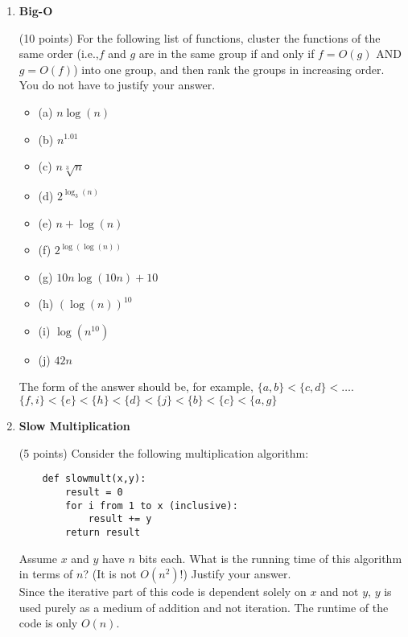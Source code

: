 \documentclass[11pt]{article}
\begin{document}
\begin{enumerate}

    \item \textbf{Big-O}
    
    (10 points) For the following list of functions, cluster the functions of the same order (i.e.,$f$ and $g$ are in the same group if and only if $f=O(g)$ AND $g=O(f)$) into one group, and then rank the groups in increasing order. You do not have to justify your answer.
\begin{multicols}{2}
\begin{itemize}
    \item (a) $n\log(n)$
    \item (b) $n^{1.01}$
    \item (c) $n\sqrt[3]{n}$
    \item (d) $2^{\log_3(n)}$
    \item (e) $n + \log(n)$
    \item (f) $2^{\log(\log(n))}$
    \item (g) $10n\log(10n)+10$
    \item (h) $(\log(n))^{10}$
    \item (i) $\log(n^{10})$
    \item (j) $42n$
\end{itemize}
\end{multicols}

The form of the answer should be, for example,  $\{a,b\}<\{c,d\}< \ldots$.\\

$\{f, i\}<\{e\}<\{h\}<\{d\}<\{j\}<\{b\}<\{c\}<\{a, g\}$
\pagebreak
    
    \item \textbf{Slow Multiplication}
    
    (5 points) Consider the following multiplication algorithm:
    
    \begin{verbatim}
    def slowmult(x,y):
        result = 0
        for i from 1 to x (inclusive):
            result += y
        return result
    \end{verbatim}
    
    Assume $x$ and $y$ have $n$ bits each. What is the running time of this algorithm in terms of $n$? (It is not $O(n^2)$!) Justify your answer.\\
    
    Since the iterative part of this code is dependent solely on $x$ and not $y$, $y$ is used purely as a medium of addition and not iteration. The runtime of the code is only $O(n)$.
    \pagebreak
    

\end{enumerate}
\end{document}
